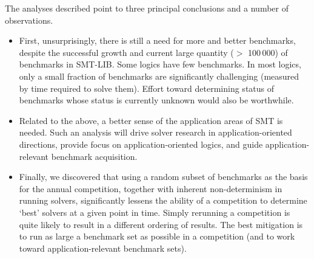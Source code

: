 \documentclass[smallcondensed]{svjour3}
\begin{document}
The analyses described point to three principal conclusions and a number of observations.
\begin{itemize}
\item First, unsurprisingly, there is still a need for more and better benchmarks, despite the successful growth and current large quantity ($>$ 100\,000) of benchmarks in SMT-LIB. Some logics have few benchmarks. In most logics, only a small fraction of benchmarks are significantly challenging (measured by time required to solve them).
Effort toward determining status of benchmarks whose status is currently unknown would also be worthwhile.
\item Related to the above, a better sense of the application areas of SMT is needed. Such an analysis will drive solver research in application-oriented directions, provide focus on application-oriented logics, and guide application-relevant benchmark acquisition.
\item Finally, we discovered that using a random subset of benchmarks as the basis for the annual competition, together with inherent non-determinism in running solvers, significantly lessens the ability of a competition to determine `best' solvers at a given point in time. Simply rerunning a competition is quite likely to result in a different ordering of results. The best mitigation is to run as large a benchmark set as possible in a competition (and to work toward application-relevant benchmark sets).
\end{itemize}
\end{document}
